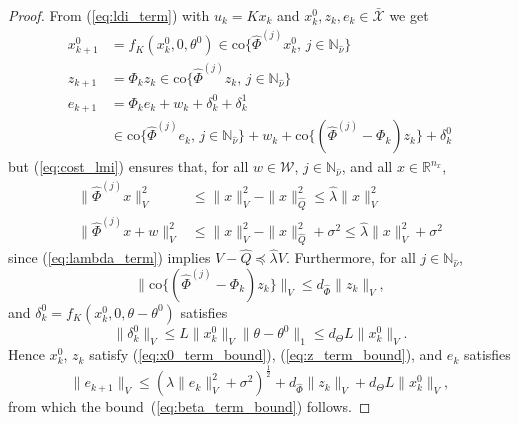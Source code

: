 \documentclass{IEEEtran}
\theoremstyle{definition}
\theoremstyle{remark}
\begin{document}
\begin{proof}
From (\ref{eq:ldi_term}) with $u_k=Kx_k$ and $x^0_k,z_k,e_k\in \bar{\mathcal{X}}$ we get
\begin{align*}
x^0_{k+1} &= f_K(x^0_k , 0, \theta^0)
\in\mathrm{co}\{\hat{\Phi}^{(j)} x^0_k , \, j \in \mathbb{N}_{\hat{\nu}} \} 
\\
z_{k+1} &= \Phi_k z_k 
\in\mathrm{co}\{\hat{\Phi}^{(j)} z_k , \, j \in \mathbb{N}_{\hat{\nu}} \} 
\\
e_{k+1} &= \Phi_k e_k + w_k + \delta^0_k + \delta^1_k 
\\
&\in\mathrm{co}\{\hat{\Phi}^{(j)} e_k , \, j \in \mathbb{N}_{\hat{\nu}} \} + w_k + \mathrm{co}\{ (\hat{\Phi}^{(j)} \!-\! \Phi_k) z_k \} + \delta^0_k 
\end{align*}
but (\ref{eq:cost_lmi}) ensures that, for all  $w\in\mathcal{W}$,  $j \in \mathbb{N}_{\hat{\nu}}$, and all $x\in\mathbb{R}^{n_x}$,
\begin{align*}
\|\hat{\Phi}^{(j)} x\|_V^2 
&\leq \|x\|_V^2 - \|x\|_{\hat{Q}}^2 \leq \hat{\lambda} \|x\|_V^2
\\
\|\hat{\Phi}^{(j)} x + w\|_V^2 
&\leq \|x\|_V^2 - \|x\|_{\hat{Q}}^2 + \sigma^2 \leq \hat{\lambda} \|x\|_V^2 + \sigma^2
\end{align*}
since (\ref{eq:lambda_term}) implies $V - \hat{Q} \preceq \hat{\lambda} V$. 
Furthermore, for all $j\in\mathbb{N}_{\hat{\nu}}$,
\[
\|\mathrm{co}\{ (\hat{\Phi}^{(j)} - \Phi_k) z_k \}\|_V 
\leq 
d_{\hat{\Phi}} \| z_k\|_V ,
\]
and $\delta^0_k = f_K(x_k^0,0,\theta - \theta^0)$ satisfies
\[
\|\delta^0_k\|_V \leq L \|x_k^0\|_V \|\theta \!-\! \theta^0\|_1
\leq 
d_{\Theta} L \| x^0_k\|_V .
\]
Hence $x^0_k$, $z_k$ satisfy (\ref{eq:x0_term_bound}), (\ref{eq:z_term_bound}), and $e_k$ satisfies  
\[
\|e_{k+1}\|_V \leq 
(\hat{\lambda} \|e_{k}\|_V^2 +\sigma^2)^\frac{1}{2}
+ d_{\hat{\Phi}} \|z_{k}\|_V + 
d_\Theta L \|x_k^0\|_V ,
\]
from which the bound~(\ref{eq:beta_term_bound}) follows.
\end{proof}
\end{document}
